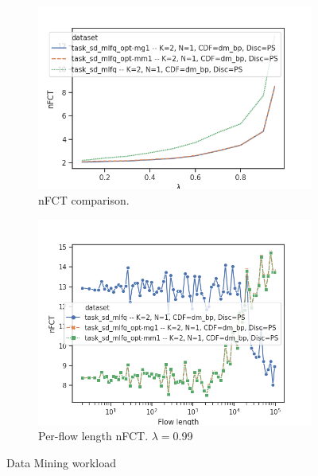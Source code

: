 \begin{figure}
	\centering
	\begin{subfigure}{.5\textwidth}
		\centering
		\includegraphics[width=1.05\textwidth]{Chapter3/Figures/dm_ps_comparison.png}
		\caption{nFCT comparison.}
		\label{fig:optlbgain-dm}
	\end{subfigure}%
	\begin{subfigure}{.5\textwidth}
		\centering
		\includegraphics[width=\textwidth]{Chapter3/Figures/dm_ps_detailed.png}
		\caption{Per-flow length nFCT. $\lambda=$0.99}
		\label{fig:optlbgainvsflowsize-dm}
	\end{subfigure}%
	\caption{Data Mining workload}
	\label{fig:optlb-dm}
\end{figure}%
